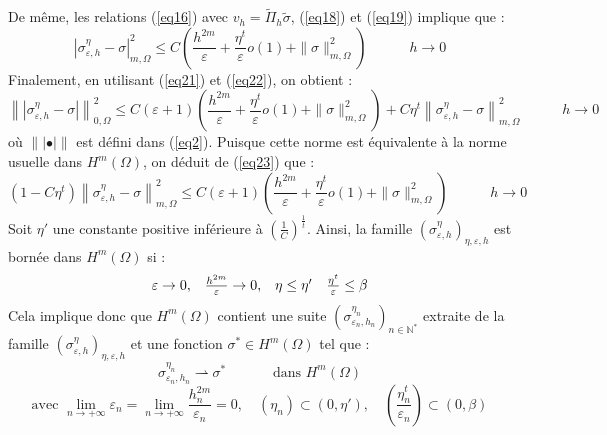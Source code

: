 \documentclass{article}
\def\tnd{\left\|\!\left|}
\def\tng{\right|\!\right\|}
\begin{document}
\begin{dem}
De même, les relations (\ref{eq16}) avec $v_h=\tilde{\Pi}_h\tilde{\sigma}$, (\ref{eq18}) et (\ref{eq19}) implique que :
\begin{equation}\label{eq22}
|\sigma_{\varepsilon, h}^\eta - \sigma|^2_{m,\Omega}\leq C\left(\frac{h^{2m}}{\varepsilon} + \frac{\eta^t}{\varepsilon} o(1) + \|\sigma\|^2_{m,\Omega}\right)
\hspace{3em} h\to 0
\end{equation}
Finalement, en utilisant (\ref{eq21}) et (\ref{eq22}), on obtient :
\begin{equation}\label{eq23}
\tnd \sigma_{\varepsilon, h}^\eta - \sigma\tng^2_{0,\Omega}\leq C(\varepsilon+1)\left(\frac{h^{2m}}{\varepsilon} + \frac{\eta^t}{\varepsilon} o(1) + \|\sigma\|^2_{m,\Omega}\right)+C\eta^t \left\| \sigma_{\varepsilon, h}^\eta -\sigma\right\|^2_{m,\Omega} \hspace{3em} h\to 0
\end{equation}
où $\tnd\bullet\tng$ est défini dans (\ref{eq2}). Puisque cette norme est équivalente à la norme usuelle dans $H^m(\Omega)$, on déduit de (\ref{eq23}) que :
\[(1-C\eta^t)\left\|\sigma^\eta_{\varepsilon, h}-\sigma\right\|_{m,\Omega}^2\leq C(\varepsilon+1)\left(\frac{h^{2m}}{\varepsilon} + \frac{\eta^t}{\varepsilon} o(1) + \|\sigma\|^2_{m,\Omega}\right) \hspace{3em} h\to 0\]
Soit $\eta'$ une constante positive inférieure à $\left( \frac{1}{C}\right)^\frac{1}{t}$. Ainsi, la famille $(\sigma^\eta_{\varepsilon, h})_{\eta,\varepsilon, h}$ est bornée dans $H^m(\Omega)$ si :
\begin{equation} \label{eq24}
\begin{array}{c c c c}
	\varepsilon\to 0,& \frac{h^{2m}}{\varepsilon}\to 0,& \eta\leq \eta' & \frac{\eta^t}{\varepsilon}\leq \beta
\end{array}
\end{equation}
Cela implique donc que $H^m(\Omega)$ contient une suite  $(\sigma^{\eta_n}_{\varepsilon_n, h_n})_{n\in\mathbb{N}^*}$ extraite de la famille $(\sigma^\eta_{\varepsilon, h})_{\eta,\varepsilon, h}$ et une fonction $\sigma^*\in H^m(\Omega)$ tel que :
\begin{equation} \label{eq25} 
\sigma^{\eta_n}_{\varepsilon_n, h_n}\rightharpoonup \sigma^* \hspace{3em} \text{ dans } H^m(\Omega)
\end{equation}
\[\text{avec } \lim_{n\to +\infty} \varepsilon_n = \lim_{n\to +\infty} \frac{h_n^{2m}}{\varepsilon_n}=0, \hspace{1em} (\eta_n)\subset (0,\eta'),\hspace{1em} \left(\frac{\eta^t_n}{\varepsilon_n}\right)\subset (0,\beta)\]


\end{dem}
\end{document}
